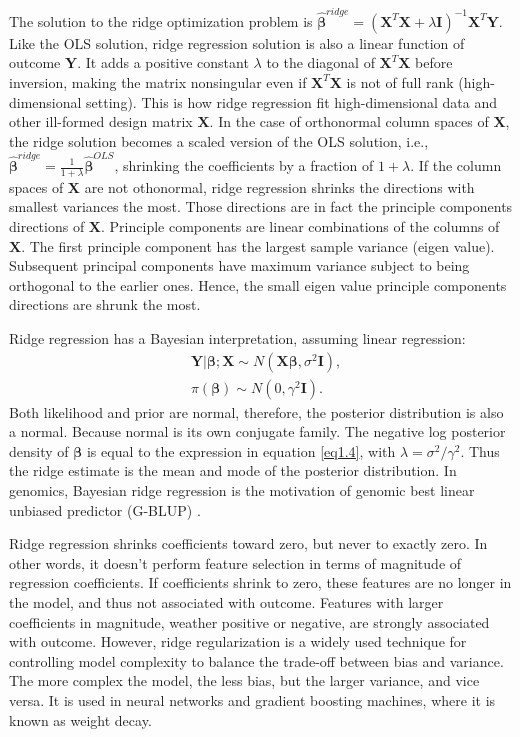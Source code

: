The solution to the ridge optimization problem is $\hat{\bm{\beta}}^{ridge}=(\bm{X}^T\bm{X}+\lambda \bm{I})^{-1}\bm{X}^T\bm{Y}$. Like the OLS solution, ridge regression solution is also a linear function of outcome $\bm{Y}$. It adds a positive constant $\lambda$ to the diagonal of $\bm{X}^T\bm{X}$ before inversion, making the matrix nonsingular even if $\bm{X}^T\bm{X}$ is not of full rank (high-dimensional setting). This is how ridge regression fit high-dimensional data and other ill-formed design matrix $\bm{X}$. In the case of orthonormal column spaces of $\bm{X}$, the ridge solution becomes a scaled version of the OLS solution, i.e., $\hat{\bm{\beta}}^{ridge}=\frac{1}{1+\lambda}\hat{\bm{\beta}}^{OLS}$, shrinking the coefficients by a fraction of $1+\lambda$. If the column spaces of $\bm{X}$ are not othonormal, ridge regression shrinks the directions with smallest variances the most. Those directions are in fact the principle components directions of $\bm{X}$. Principle components are linear combinations of the columns of $\bm{X}$. The first principle component has the largest sample variance (eigen value). Subsequent principal components have maximum variance subject to being orthogonal to the earlier ones. Hence, the small eigen value principle components directions are shrunk the most. 

Ridge regression has a Bayesian interpretation, assuming linear regression:
\begin{align*}
    &\bm{Y}|\bm{\beta};\bm{X} \sim N(\bm{X\beta}, \sigma^2\bm{I}), \\
    &\pi(\bm{\beta}) \sim N(0, \gamma^2\bm{I}).
\end{align*}
Both likelihood and prior are normal, therefore, the posterior distribution is also a normal. Because normal is its own conjugate family. The negative log posterior density of $\bm{\beta}$ is equal to the expression in equation \eqref{eq1.4}, with $\lambda=\sigma^2/\gamma^2$. Thus the ridge estimate is the mean and mode of the posterior distribution. In genomics, Bayesian ridge regression is the motivation of genomic best linear unbiased predictor (G-BLUP) \citep{de2013prediction}. 

Ridge regression shrinks coefficients toward zero, but never to exactly zero. In other words, it doesn't perform feature selection in terms of magnitude of regression coefficients. If coefficients shrink to zero, these features are no longer in the model, and thus not associated with outcome. Features with larger coefficients in magnitude, weather positive or negative, are strongly associated with outcome. However, ridge regularization is a widely used technique for controlling model complexity to balance the trade-off between bias and variance. The more complex the model, the less bias, but the larger variance, and vice versa. It is used in neural networks and gradient boosting machines, where it is known as weight decay.    


